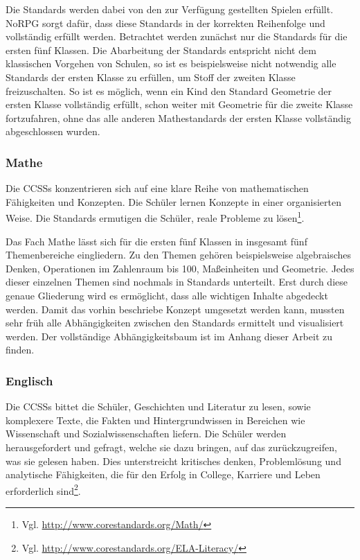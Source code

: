 Die Standards werden dabei von den zur Verfügung gestellten Spielen erfüllt. NoRPG sorgt dafür, dass diese Standards in der korrekten Reihenfolge und vollständig erfüllt werden. Betrachtet werden zunächst nur die Standards für die ersten fünf Klassen. Die Abarbeitung der Standards entspricht nicht dem klassischen Vorgehen von Schulen, so ist es beispielsweise nicht notwendig alle Standards der ersten Klasse zu erfüllen, um Stoff der zweiten Klasse freizuschalten. So ist es möglich, wenn ein Kind den Standard Geometrie der ersten Klasse vollständig erfüllt, schon weiter mit Geometrie für die zweite Klasse fortzufahren, ohne das alle anderen Mathestandards der ersten Klasse vollständig abgeschlossen wurden.

\subsubsection{Mathe}
Die \acp{CCSS} konzentrieren sich auf eine klare Reihe von mathematischen Fähigkeiten und Konzepten. Die Schüler lernen Konzepte in einer organisierten Weise. Die Standards ermutigen die Schüler, reale Probleme zu lösen\footnote{Vgl. \url{http://www.corestandards.org/Math/}}.

Das Fach Mathe lässt sich für die ersten fünf Klassen in insgesamt fünf Themenbereiche eingliedern. Zu den Themen gehören beispielsweise algebraisches Denken, Operationen im Zahlenraum bis 100, Maßeinheiten und Geometrie. Jedes dieser einzelnen Themen sind nochmals in Standards unterteilt. Erst durch diese genaue Gliederung wird es ermöglicht, dass alle wichtigen Inhalte abgedeckt werden. Damit das vorhin beschriebe Konzept umgesetzt werden kann, mussten sehr früh alle Abhängigkeiten zwischen den Standards ermittelt und visualisiert werden. Der vollständige Abhängigkeitsbaum ist im Anhang dieser Arbeit zu finden.

\subsubsection{Englisch}
Die \acp{CCSS} bittet die Schüler, Geschichten und Literatur zu lesen, sowie komplexere Texte, die Fakten und Hintergrundwissen in Bereichen wie Wissenschaft und Sozialwissenschaften liefern. Die Schüler werden herausgefordert und gefragt, welche sie dazu bringen, auf das zurückzugreifen, was sie gelesen haben. Dies unterstreicht kritisches denken, Problemlösung und analytische Fähigkeiten, die für den Erfolg in College, Karriere und Leben erforderlich sind\footnote{Vgl. \url{http://www.corestandards.org/ELA-Literacy/}}.


